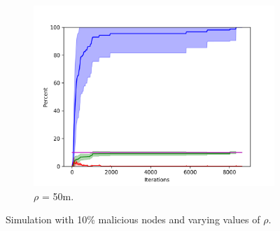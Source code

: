 \begin{figure}
\begin{subfigure}{0.6\textwidth}
\includegraphics[width=\linewidth]{images/plots/Network_rA_10.0/new_plots/50_10.png}
\caption{$\rho$ = 50m.} \label{fig:tarjan0}
\end{subfigure}

\caption{Simulation with 10\% malicious nodes and varying values of $\rho$.}
\label{fig:random103050}
\end{figure}




